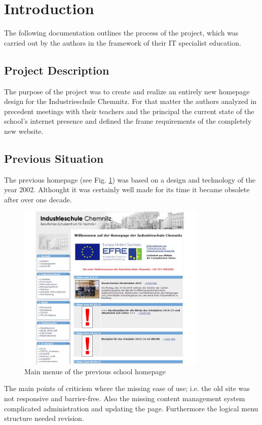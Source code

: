 \section{Introduction}
\label{sec:Introduction}

The following documentation outlines the process of the project, which was carried out by the authors
in the framework of their IT specialist education.

\subsection{Project Description}
\label{sec:ProjectDescription}
The purpose of the project was to create and realize an entirely new homepage design for the Industrieschule Chemnitz. For 
that matter the authors analyzed in precedent meetings with their teachers and the principal the current state of the school's
 internet presence and defined the frame requirements of the completely new website.

\subsection{Previous Situation}
\label{sec:PreviousSituation}
The previous homepage (see Fig. \ref{fig:pageOld}) was based on a design and technology of the year 2002. Althought it was certainly well made for its time
it became obsolete after over one decade.
\begin{figure}[ht]
	\centering
	\includegraphics[width=0.80\textwidth]{./Bilder/oldpage.jpg}
	\caption{Main menue of the previous school homepage}
	\label{fig:pageOld}
\end{figure}
The main points of criticism where the missing ease of use; i.e. the old site was not responsive and barrier-free. Also 
the missing content management system complicated administration and updating the page. Furthermore the logical 
menu structure needed revision. 

